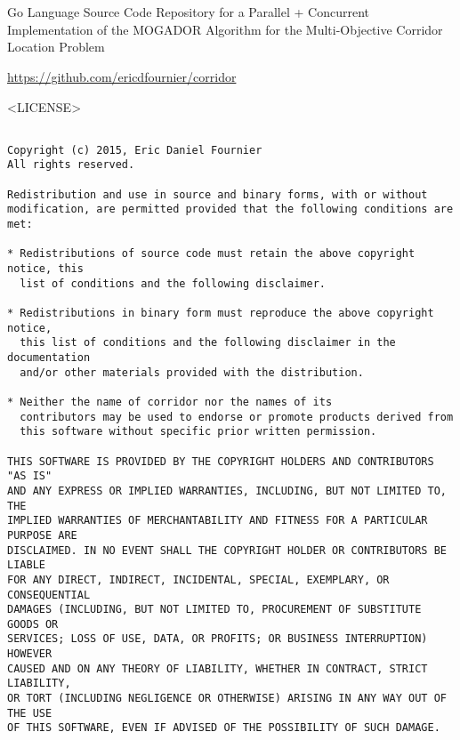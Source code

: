 \chapter{}
\label{A}

Go Language Source Code Repository for a Parallel + Concurrent Implementation of the MOGADOR Algorithm for the Multi-Objective Corridor Location Problem

\begin{center}
    
    \url{https://github.com/ericdfournier/corridor}
    
\end{center}

\newpage

<LICENSE>

\begin{lstlisting}[basicstyle=\tiny]

Copyright (c) 2015, Eric Daniel Fournier
All rights reserved.

Redistribution and use in source and binary forms, with or without
modification, are permitted provided that the following conditions are met:

* Redistributions of source code must retain the above copyright notice, this
  list of conditions and the following disclaimer.

* Redistributions in binary form must reproduce the above copyright notice,
  this list of conditions and the following disclaimer in the documentation
  and/or other materials provided with the distribution.

* Neither the name of corridor nor the names of its
  contributors may be used to endorse or promote products derived from
  this software without specific prior written permission.

THIS SOFTWARE IS PROVIDED BY THE COPYRIGHT HOLDERS AND CONTRIBUTORS "AS IS"
AND ANY EXPRESS OR IMPLIED WARRANTIES, INCLUDING, BUT NOT LIMITED TO, THE
IMPLIED WARRANTIES OF MERCHANTABILITY AND FITNESS FOR A PARTICULAR PURPOSE ARE
DISCLAIMED. IN NO EVENT SHALL THE COPYRIGHT HOLDER OR CONTRIBUTORS BE LIABLE
FOR ANY DIRECT, INDIRECT, INCIDENTAL, SPECIAL, EXEMPLARY, OR CONSEQUENTIAL
DAMAGES (INCLUDING, BUT NOT LIMITED TO, PROCUREMENT OF SUBSTITUTE GOODS OR
SERVICES; LOSS OF USE, DATA, OR PROFITS; OR BUSINESS INTERRUPTION) HOWEVER
CAUSED AND ON ANY THEORY OF LIABILITY, WHETHER IN CONTRACT, STRICT LIABILITY,
OR TORT (INCLUDING NEGLIGENCE OR OTHERWISE) ARISING IN ANY WAY OUT OF THE USE
OF THIS SOFTWARE, EVEN IF ADVISED OF THE POSSIBILITY OF SUCH DAMAGE.

\end{lstlisting}

